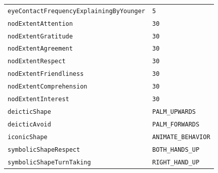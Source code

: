 \documentclass{CSSRforAfrica}
\begin{document}
\begin{table}[H]
\begin{tabular}{l l}
{\footnotesize \verb+eyeContactFrequencyExplainingByYounger+}   & {\footnotesize \verb+5+} \vspace{-1.5mm} \\
{\footnotesize \verb+nodExtentAttention+} 	                                   & {\footnotesize \verb+30+ }\vspace{-1.5mm} \\
{\footnotesize \verb+nodExtentGratitude+} 	                                   & {\footnotesize \verb+30+ }\vspace{-1.5mm} \\
{\footnotesize \verb+nodExtentAgreement+} 	                           & {\footnotesize \verb+30+ }\vspace{-1.5mm} \\
{\footnotesize \verb+nodExtentRespect+} 	                                   & {\footnotesize \verb+30+ }\vspace{-1.5mm} \\
{\footnotesize \verb+nodExtentFriendliness+} 	                           & {\footnotesize \verb+30+ }\vspace{-1.5mm} \\
{\footnotesize \verb+nodExtentComprehension+}                           & {\footnotesize \verb+30+ }\vspace{-1.5mm} \\
{\footnotesize \verb+nodExtentInterest+} 	                                  & {\footnotesize \verb+30+ }\vspace{-1.5mm} \\
{\footnotesize \verb+deicticShape+} 	                                          & {\footnotesize \verb+PALM_UPWARDS+} \vspace{-1.5mm}\\
{\footnotesize \verb+deicticAvoid+} 	                                          & {\footnotesize \verb+PALM_FORWARDS+}  \vspace{-1.5mm}\\
{\footnotesize \verb+iconicShape+} 	                                          & {\footnotesize \verb+ANIMATE_BEHAVIOR+} \vspace{-1.5mm}\\
{\footnotesize \verb+symbolicShapeRespect+}                                 & {\footnotesize \verb+BOTH_HANDS_UP+ } \vspace{-1.5mm}\\
{\footnotesize \verb+symbolicShapeTurnTaking+}                          & {\footnotesize \verb+RIGHT_HAND_UP+ } \vspace{-1.5mm}\\

\end{tabular}
\end{table}
\end{document}
